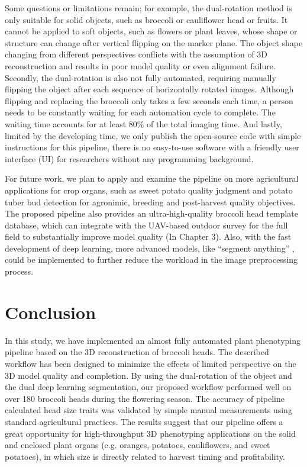 Some questions or limitations remain; for example, the dual-rotation method is only suitable for solid objects, such as broccoli or cauliflower head or fruits. It cannot be applied to soft objects, such as flowers or plant leaves, whose shape or structure can change after vertical flipping on the marker plane. The object shape changing from different perspectives conflicts with the assumption of 3D reconstruction and results in poor model quality or even alignment failure. Secondly, the dual-rotation is also not fully automated, requiring manually flipping the object after each sequence of horizontally rotated images. Although flipping and replacing the broccoli only takes a few seconds each time, a person needs to be constantly waiting for each automation cycle to complete. The waiting time accounts for at least 80\% of the total imaging time. And lastly, limited by the developing time, we only publish the open-source code with simple instructions for this pipeline, there is no easy-to-use software with a friendly user interface (UI) for researchers without any programming background.

For future work, we plan to apply and examine the pipeline on more agricultural applications for crop organs, such as sweet potato quality judgment and potato tuber bud detection for agronimic, breeding and post-harvest quality objectives. The proposed pipeline also provides an ultra-high-quality broccoli head template database, which can integrate with the UAV-based outdoor survey for the full field to substantially improve model quality (In Chapter 3). Also, with the fast development of deep learning, more advanced models, like ``segment anything'' \citep{kirillov_segany_2023}, could be implemented to further reduce the workload in the image preprocessing process.

\section{Conclusion}

In this study, we have implemented an almost fully automated plant phenotyping pipeline based on the 3D reconstruction of broccoli heads. The described workflow has been designed to minimize the effects of limited perspective on the 3D model quality and completion. By using the dual-rotation of the object and the dual deep learning segmentation, our proposed workflow performed well on over 180 broccoli heads during the flowering season. The accuracy of pipeline calculated head size traits was validated by simple manual measurements using standard agricultural practices. The results suggest that our pipeline offers a great opportunity for high-throughput 3D phenotyping applications on the solid and enclosed plant organs (e.g. oranges, potatoes, cauliflowers, and sweet potatoes), in which size is directly related to harvest timing and profitability.
